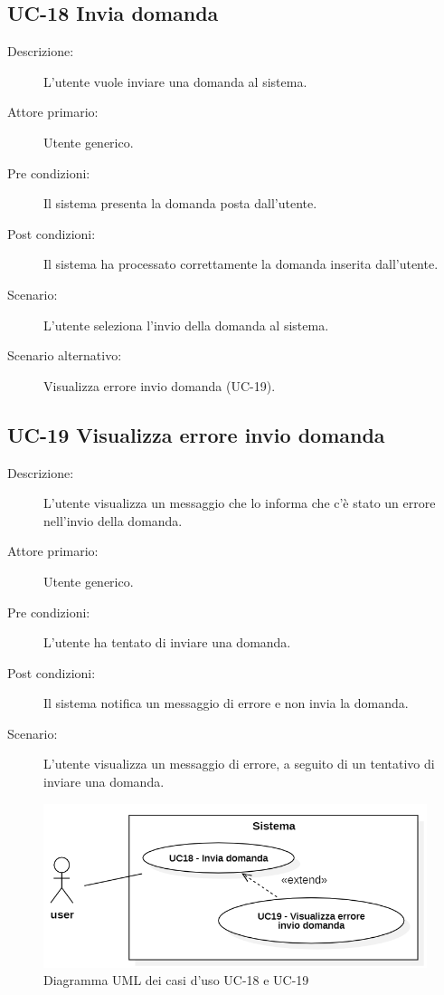\subsection{UC-18 Invia domanda}
\begin{description}
    \item[Descrizione:] L'utente vuole inviare una domanda al sistema.
    \item[Attore primario:] Utente generico.
    \item[Pre condizioni:] Il sistema presenta la domanda posta dall'utente.
    \item[Post condizioni:] Il sistema ha processato correttamente la domanda inserita dall'utente.
    \item[Scenario:] L'utente seleziona l'invio della domanda al sistema.
    \item[Scenario alternativo:] Visualizza errore invio domanda (UC-19).
\end{description}

\subsection{UC-19 Visualizza errore invio domanda}
\begin{description}
    \item[Descrizione:] L'utente visualizza un messaggio che lo informa che c'è stato un errore nell'invio della domanda.
    \item[Attore primario:] Utente generico.
    \item[Pre condizioni:] L'utente ha tentato di inviare una domanda.
    \item[Post condizioni:] Il sistema notifica un messaggio di errore e non invia la domanda.
    \item[Scenario:] L'utente visualizza un messaggio di errore, a seguito di un tentativo di inviare una domanda.
\end{description}

\begin{figure}[H]
    \centering
    \includegraphics[width=\linewidth]{UC18-19.PNG}
    \caption{Diagramma UML dei casi d'uso UC-18 e UC-19}
    \label{fig:UC18-19}
\end{figure}

